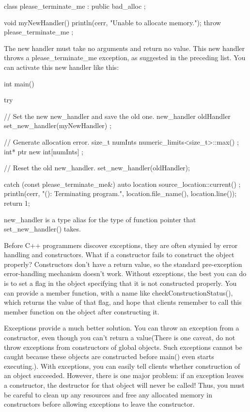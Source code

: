 \begin{cpp}
class please_terminate_me : public bad_alloc { };

void myNewHandler()
{
    println(cerr, "Unable to allocate memory.");
    throw please_terminate_me {};
}
\end{cpp}

The new handler must take no arguments and return no value. This new handler throws a please\_terminate\_me exception, as suggested in the preceding list. You can activate this new handler like this:

\begin{cpp}
int main()
{
    try {
        // Set the new new_handler and save the old one.
        new_handler oldHandler { set_new_handler(myNewHandler) };

        // Generate allocation error.
        size_t numInts { numeric_limits<size_t>::max() };
        int* ptr { new int[numInts] };

        // Reset the old new_handler.
        set_new_handler(oldHandler);
    } catch (const please_terminate_me&) {
        auto location { source_location::current() };
        println(cerr, "{}({}): Terminating program.",
            location.file_name(), location.line());
        return 1;
    }
}
\end{cpp}

new\_handler is a type alias for the type of function pointer that set\_new\_handler() takes.


Before C++ programmers discover exceptions, they are often stymied by error handling and constructors. What if a constructor fails to construct the object properly? Constructors don’t have a return value, so the standard pre-exception error-handling mechanism doesn’t work. Without exceptions, the best you can do is to set a flag in the object specifying that it is not constructed properly. You can provide a member function, with a name like checkConstructionStatus(), which returns the value of that flag, and hope that clients remember to call this member function on the object after constructing it.

Exceptions provide a much better solution. You can throw an exception from a constructor, even though you can’t return a value(There is one caveat, do not throw exceptions from constructors of global objects. Such exceptions cannot be caught because these objects are constructed before main() even starts executing.). With exceptions, you can easily tell clients whether construction of an object succeeded. However, there is one major problem: if an exception leaves a constructor, the destructor for that object will never be called! Thus, you must be careful to clean up any resources and free any allocated memory in constructors before allowing exceptions to leave the constructor.

